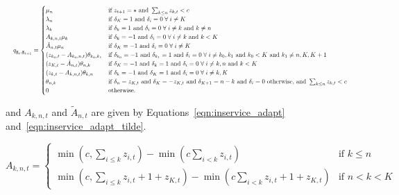 \documentclass{article}
\begin{document}
\begin{equation}\label{eqn:transitions_sojourn}
\resizebox{\textwidth}{!}{%
$q_{\underline{\mathbf{z}}_t, \underline{\mathbf{z}}_{t+1}} = 
\begin{cases}
\mu_n & \text{if } z_{t+1} = \star \text{ and } \sum_{k \leq n} z_{k, t} < c \\
\lambda_n & \text{if } \delta_K = 1 \text{ and } \delta_i = 0 \; \forall \; i \neq K \\
\lambda_k & \text{if } \delta_k = 1 \text{ and } \delta_i = 0 \; \forall \; i \neq k \text{ and } k \neq n\\
A_{k,n,t} \mu_k & \text{if } \delta_k = -1 \text{ and } \delta_i = 0 \; \forall \; i \neq k \text{ and } k < K\\
\tilde{A}_{n,t} \mu_n & \text{if } \delta_K = -1 \text{ and } \delta_i = 0 \; \forall \; i \neq K\\
(z_{k_0,t} - A_{k_0,n,t}) \theta_{k_0,k_1} & \text{if } \delta_{k_0} = -1 \text{ and } \delta_{k_1} = 1 \text{ and } \delta_i = 0 \; \forall \; i \neq k_0, k_1 \text{ and } k_0 < K \text{ and } k_1 \neq n, K, K+1 \\
(z_{K,t} - \tilde{A}_{n,t}) \theta_{n,k} & \text{if } \delta_K = -1 \text{ and } \delta_{k} = 1 \text{ and } \delta_i = 0 \; \forall \; i \neq k, n \text{ and } k < K \\
(z_{k,t} - A_{k,n,t}) \theta_{k,n} & \text{if } \delta_k = -1 \text{ and } \delta_K = 1 \text{ and } \delta_i = 0 \; \forall \; i \neq k, K \\
\theta_{n, k} & \text{if } \delta_n = z_{K,t} \text{ and } \delta_K = -z_{K,t} \text{ and } \delta_{K+1} = n - k \text{ and } \delta_i = 0 \text{ otherwise, and } \sum_{k \leq n} z_{k, t} < c \\
0 & \text{otherwise.}
\end{cases}$%
}
\end{equation}

and $A_{k,n,t}$ and $\tilde{A}_{n, t}$ are given by
Equations~\ref{eqn:inservice_adapt} and~\ref{eqn:inservice_adapt_tilde}.

\begin{equation}\label{eqn:inservice_adapt}
A_{k,n,t} =
\begin{cases}
\min\left(c, \sum_{i \leq k} z_{i,t}\right) - \min\left(c \sum_{i < k} z_{i,t}\right) & \text{if } k \leq n \\
\min\left(c, \sum_{i \leq k} z_{i,t} + 1 + z_{K,t}\right) - \min\left(c \sum_{i < k} z_{i,t} + 1 + z_{K,t}\right) & \text{if } n < k < K
\end{cases}
\end{equation}
\end{document}

